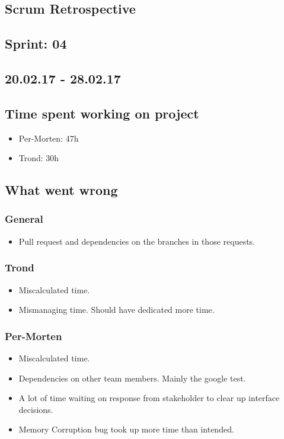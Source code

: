 \documentclass{article}
\begin{document}
\begin{center}
\section*{Scrum Retrospective}
\subsection*{Sprint: 04}
\subsection*{20.02.17 - 28.02.17}
\end{center}
\bigskip

\subsection*{Time spent working on project}
\begin{itemize}
    \item
    Per-Morten: 47h

    \item
    Trond: 30h
\end{itemize}

\subsection*{What went wrong}
\subsubsection*{General}
\begin{itemize}
    \item
    Pull request and dependencies on the branches in those requests.
\end{itemize}

\subsubsection*{Trond}
\begin{itemize}
    \item 
    Miscalculated time.

    \item
    Mismanaging time. Should have dedicated more time.
\end{itemize}

\subsubsection*{Per-Morten}
\begin{itemize}
    \item
    Miscalculated time.

    \item
    Dependencies on other team members. Mainly the google test.

    \item
    A lot of time waiting on response from stakeholder to clear up interface decisions.

    \item
    Memory Corruption bug took up more time than intended.
\end{itemize}
\end{document}
